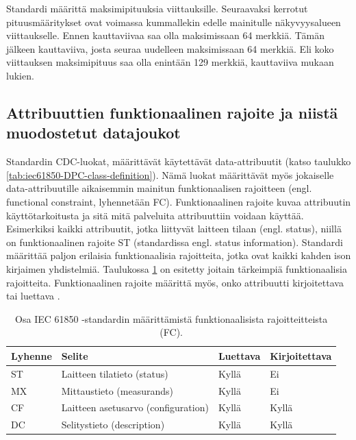 Standardi määrittä maksimipituuksia viittauksille. Seuraavaksi kerrotut pituusmääritykset ovat voimassa kummallekin edelle mainitulle näkyvyysalueen viittaukselle. Ennen kauttaviivaa saa olla maksimissaan 64 merkkiä. Tämän jälkeen kauttaviiva, josta seuraa uudelleen maksimissaan 64 merkkiä. Eli koko viittauksen maksimipituus saa olla enintään 129 merkkiä, kauttaviiva mukaan lukien. \cite[s.~24,183]{IEC61850-7-2}


\subsection{Attribuuttien funktionaalinen rajoite ja niistä muodostetut datajoukot}
\label{ch:fc-and-dataset}
Standardin CDC-luokat, määrittävät käytettävät data-attribuutit (katso taulukko \ref{tab:iec61850-DPC-class-definition}). Nämä luokat määrittävät myös jokaiselle data-attribuutille aikaisemmin mainitun funktionaalisen rajoitteen (engl. functional constraint, lyhennetään FC). Funktionaalinen rajoite kuvaa attribuutin käyttötarkoitusta ja sitä mitä palveluita attribuuttiin voidaan käyttää. Esimerkiksi kaikki attribuutit, jotka liittyvät laitteen tilaan (engl. status), niillä on funktionaalinen rajoite ST (standardissa engl. status information). Standardi määrittää paljon erilaisia funktionaalisia rajoitteita, jotka ovat kaikki kahden ison kirjaimen yhdistelmiä. Taulukossa \ref{tab:iec61850-functional-constraints} on esitetty joitain tärkeimpiä funktionaalisia rajoitteita. Funktionaalinen rajoite määrittä myös, onko attribuutti kirjoitettava tai luettava \cite[s.~54]{IEC61850-7-2}.

\begin{table}[ht!]
	\caption{Osa IEC 61850 -standardin määrittämistä funktionaalisista rajoitteitteista (FC).}
	\label{tab:iec61850-functional-constraints}
	\begin{tabular}{l | l | l | l}
		\hline
		\textbf{Lyhenne} & \textbf{Selite} & \textbf{Luettava} & \textbf{Kirjoitettava} \\
		\hline \hline
		ST & Laitteen tilatieto (status) & Kyllä & Ei \\
		MX & Mittaustieto (measurands) & Kyllä & Ei \\
		CF & Laitteen asetusarvo (configuration) & Kyllä & Kyllä \\
		DC & Selitystieto (description) & Kyllä & Kyllä \\
		\hline
	\end{tabular}
\end{table}

